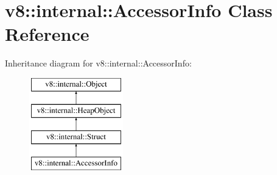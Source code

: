 \hypertarget{classv8_1_1internal_1_1AccessorInfo}{}\section{v8\+:\+:internal\+:\+:Accessor\+Info Class Reference}
\label{classv8_1_1internal_1_1AccessorInfo}
Inheritance diagram for v8\+:\+:internal\+:\+:Accessor\+Info\+:\begin{figure}[H]
\begin{center}
\leavevmode
\includegraphics[height=4.000000cm]{classv8_1_1internal_1_1AccessorInfo}
\end{center}
\end{figure}
